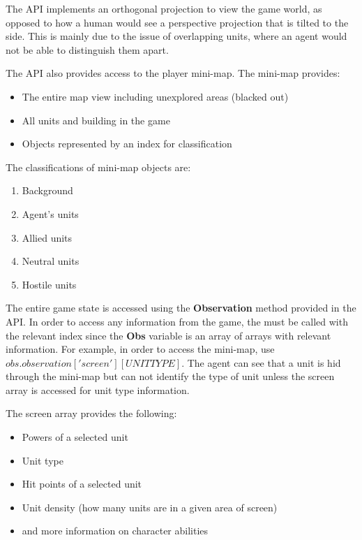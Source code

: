 The API implements an orthogonal projection to view the game world, as opposed
to how a human would see a perspective projection that is tilted to the side.
This is mainly due to the issue of overlapping units, where an agent would not
be able to distinguish them apart.


The API also provides access to the player mini-map. The mini-map provides:

\begin{itemize}
    \item The entire map view including unexplored areas (blacked out)
    \item All units and building in the game
    \item Objects represented by an index for classification
\end{itemize}

The classifications of mini-map objects are:
\begin{enumerate}
    \item Background
    \item Agent's units
    \item Allied units
    \item Neutral units
    \item Hostile units
\end{enumerate}

The entire game state is accessed using the \textbf{Observation} method provided in the API\@.
In order to access any information from the game, the must be called with the
relevant index since the \textbf{Obs} variable is an array of arrays with
relevant information. For example, in order to access the mini-map,
use $obs.observation['screen'][UNITTYPE]$. The agent can see that a
unit is hid through the mini-map but can not identify the type of
unit unless the screen array is accessed for unit type information.

The screen array provides the following:

\begin{itemize}
    \item Powers of a selected unit
    \item Unit type
    \item Hit points of a selected unit
    \item Unit density (how many units are in a given area of screen)
    \item and more information on character abilities
\end{itemize}

